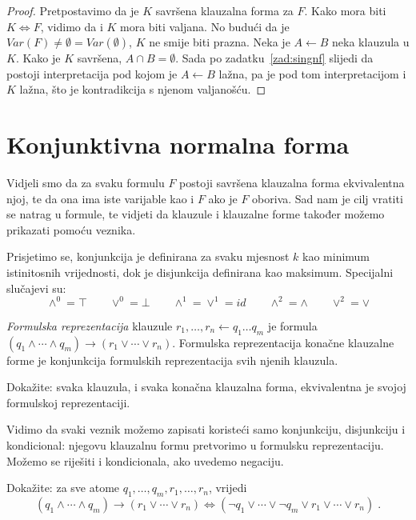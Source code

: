 \begin{proof}
Pretpostavimo da je $K$ savršena klauzalna forma za $F$. Kako mora biti $K\Leftrightarrow F$, vidimo da i $K$ mora biti valjana. No budući da je $Var(F)\not=\emptyset=Var(\emptyset)$, $K$ ne smije biti prazna. Neka je $A\leftarrow B$ neka klauzula u $K$. Kako je $K$ savršena, $A\cap B=\emptyset$. Sada po zadatku~\ref{zad:singnf} slijedi da postoji interpretacija pod kojom je $A\leftarrow B$ lažna, pa je pod tom interpretacijom i $K$ lažna, što je kontradikcija s njenom valjanošću.
\end{proof}

\section{Konjunktivna normalna forma}

Vidjeli smo da za svaku formulu $F$ postoji savršena klauzalna forma ekvivalentna njoj, te da ona ima iste varijable kao i $F$ ako je $F$ oboriva. Sad nam je cilj vratiti se natrag u formule, te vidjeti da klauzule i klauzalne forme također možemo prikazati pomoću veznika.

Prisjetimo se, konjunkcija je definirana za svaku mjesnost $k$ kao minimum istinitosnih vrijednosti, dok je disjunkcija definirana kao maksimum. Specijalni slučajevi su:
$$\wedge^0=\top\qquad\vee^0=\bot\qquad\wedge^1=\vee^1=id\qquad\wedge^2=\wedge\qquad\vee^2=\vee$$

\begin{definicija}
\emph{Formulska reprezentacija} klauzule $r_1,\ldots,r_n\leftarrow q_1\ldots q_m$ je formula $(q_1\wedge\cdots\wedge q_m)\to(r_1\vee\cdots\vee r_n)$. Formulska reprezentacija konačne klauzalne forme je konjunkcija formulskih reprezentacija svih njenih klauzula.
\end{definicija}

\begin{zadatak}\label{zad:clfeqfr}
Dokažite: svaka klauzula, i svaka konačna klauzalna forma, ekvivalentna je svojoj formulskoj reprezentaciji.
\end{zadatak}

Vidimo da svaki veznik možemo zapisati koristeći samo konjunkciju, disjunkciju i kondicional: njegovu klauzalnu formu pretvorimo u formulsku reprezentaciju. Možemo se riješiti i kondicionala, ako uvedemo negaciju.

\begin{zadatak}\label{zad:clfcnf}
	Dokažite: za sve atome $q_1,\ldots,q_m,r_1,\ldots,r_n$, vrijedi
	$$(q_1\wedge\cdots\wedge q_m)\to(r_1\vee\cdots\vee r_n)
	\Longleftrightarrow
	(\neg q_1\vee\cdots\vee\neg q_m\vee r_1\vee\cdots\vee r_n)\;.
	$$
\end{zadatak}

